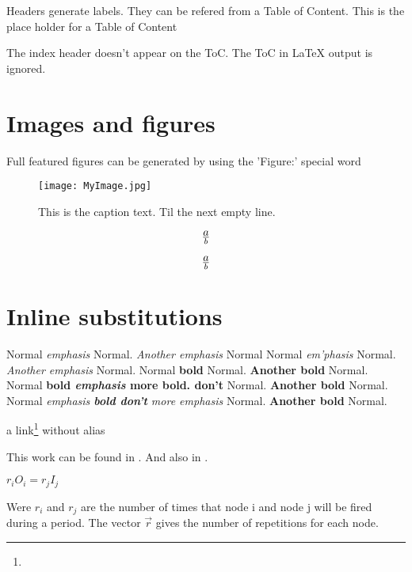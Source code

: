 Headers generate labels.
They can be refered from a Table of Content.
This is the place holder for a Table of Content



The index header doesn't appear on the ToC.
The ToC in LaTeX output is ignored.

\section{Images and figures}
\label{OtherLabel}

Full featured figures can be generated by using the 'Figure:' special word
\begin{figure*}[htbp]
\begin{center}\texttt{[image: MyImage.jpg]}\end{center}
\caption{%
This is the caption text.
Til the next empty line.
}
\label{MyLabel}
\end{figure*}


\[
a\over{b}
\]

\begin{equation}
a\over{b}
\end{equation}



\section{Inline substitutions}

Normal {\em emphasis} Normal. {\em Another emphasis} Normal
Normal {\em em'phasis} Normal. {\em Another emphasis} Normal.
Normal {\bf bold} Normal. {\bf Another bold} Normal.
Normal {\bf bold {\em emphasis} more bold. don't } Normal. {\bf Another bold} Normal.
Normal {\em emphasis {\bf bold don't} more emphasis} Normal. {\bf Another bold} Normal.

a link\footnote{}
 without alias

This work can be found in \cite{lee87}. And also in \cite{www-CLAM}.


$r_iO_i=r_jI_j$

Were $r_i$ and $r_j$ are the number of times that node i and node j will be fired during a period. The vector $\vec{r}$ gives the number of repetitions for each node.


